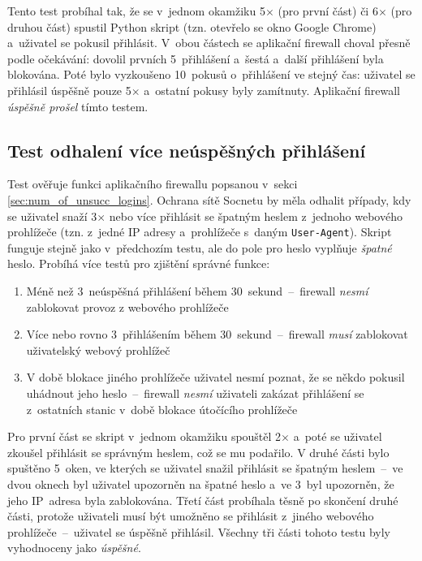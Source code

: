 \noindent
Tento test probíhal tak, že se v~jednom okamžiku 5$\times$ (pro první část) či 6$\times$ (pro druhou část) spustil Python skript (tzn. otevřelo se okno Google Chrome) a~uživatel se pokusil přihlásit. V~obou částech se aplikační firewall choval přesně podle očekávání: dovolil prvních 5~přihlášení a~šestá a~další přihlášení byla blokována. Poté bylo vyzkoušeno 10~pokusů o~přihlášení ve stejný čas: uživatel se přihlásil úspěšně pouze 5$\times$ a~ostatní pokusy byly zamítnuty. Aplikační firewall \textit{úspěšně prošel} tímto testem.

\subsection*{Test odhalení více neúspěšných přihlášení}
Test ověřuje funkci aplikačního firewallu popsanou v~sekci \ref{sec:num_of_unsucc_logins}. Ochrana sítě Socnetu by měla odhalit případy, kdy se uživatel snaží 3$\times$ nebo více přihlásit se špatným heslem z~jednoho webového prohlížeče (tzn. z~jedné IP adresy a~prohlížeče s~daným \texttt{User-Agent}). Skript funguje stejně jako v~předchozím testu, ale do pole pro heslo vyplňuje \textit{špatné} heslo. Probíhá více testů pro zjištění správné funkce:

\begin{enumerate}
  \item Méně než 3~neúspěšná přihlášení během 30~sekund~--~firewall \textit{nesmí} zablokovat provoz z webového prohlížeče
  \item Více nebo rovno 3~přihlášením během 30~sekund~--~firewall \textit{musí} zablokovat uživatelský webový prohlížeč
  \item V době blokace jiného prohlížeče uživatel nesmí poznat, že se někdo pokusil uhádnout jeho heslo~--~firewall \textit{nesmí} uživateli zakázat přihlášení se z~ostatních stanic v~době blokace útočícího prohlížeče
\end{enumerate}

\noindent
Pro první část se skript v~jednom okamžiku spouštěl 2$\times$ a~poté se uživatel zkoušel přihlásit se správným heslem, což se mu podařilo. V druhé části bylo spuštěno 5~oken, ve kterých se uživatel snažil přihlásit se špatným heslem~--~ve dvou oknech byl uživatel upozorněn na špatné heslo a~ve 3~byl upozorněn, že jeho IP~adresa byla zablokována. Třetí část probíhala těsně po skončení druhé části, protože uživateli musí být umožněno se přihlásit z~jiného webového prohlížeče~--~uživatel se úspěšně přihlásil. Všechny tři části tohoto testu byly vyhodnoceny jako \textit{úspěšné}.


